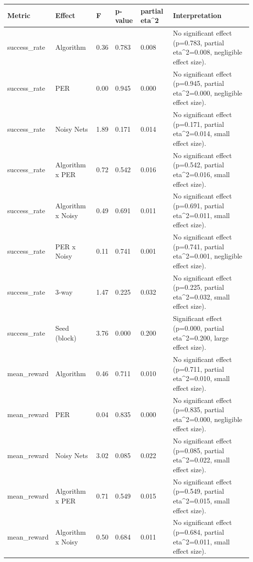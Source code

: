 \begin{tabular}{llllll}
\toprule
Metric & Effect & F & p-value & partial eta\textasciicircum 2 & Interpretation \\
\midrule
success\_rate & Algorithm & 0.36 & 0.783 & 0.008 & No significant effect (p=0.783, partial eta\textasciicircum 2=0.008, negligible effect size). \\
success\_rate & PER & 0.00 & 0.945 & 0.000 & No significant effect (p=0.945, partial eta\textasciicircum 2=0.000, negligible effect size). \\
success\_rate & Noisy Nets & 1.89 & 0.171 & 0.014 & No significant effect (p=0.171, partial eta\textasciicircum 2=0.014, small effect size). \\
success\_rate & Algorithm x PER & 0.72 & 0.542 & 0.016 & No significant effect (p=0.542, partial eta\textasciicircum 2=0.016, small effect size). \\
success\_rate & Algorithm x Noisy & 0.49 & 0.691 & 0.011 & No significant effect (p=0.691, partial eta\textasciicircum 2=0.011, small effect size). \\
success\_rate & PER x Noisy & 0.11 & 0.741 & 0.001 & No significant effect (p=0.741, partial eta\textasciicircum 2=0.001, negligible effect size). \\
success\_rate & 3-way & 1.47 & 0.225 & 0.032 & No significant effect (p=0.225, partial eta\textasciicircum 2=0.032, small effect size). \\
success\_rate & Seed (block) & 3.76 & 0.000 & 0.200 & Significant effect (p=0.000, partial eta\textasciicircum 2=0.200, large effect size). \\
mean\_reward & Algorithm & 0.46 & 0.711 & 0.010 & No significant effect (p=0.711, partial eta\textasciicircum 2=0.010, small effect size). \\
mean\_reward & PER & 0.04 & 0.835 & 0.000 & No significant effect (p=0.835, partial eta\textasciicircum 2=0.000, negligible effect size). \\
mean\_reward & Noisy Nets & 3.02 & 0.085 & 0.022 & No significant effect (p=0.085, partial eta\textasciicircum 2=0.022, small effect size). \\
mean\_reward & Algorithm x PER & 0.71 & 0.549 & 0.015 & No significant effect (p=0.549, partial eta\textasciicircum 2=0.015, small effect size). \\
mean\_reward & Algorithm x Noisy & 0.50 & 0.684 & 0.011 & No significant effect (p=0.684, partial eta\textasciicircum 2=0.011, small effect size). \\

\end{tabular}

